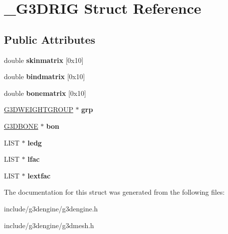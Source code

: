 \hypertarget{struct__G3DRIG}{}\section{\+\_\+\+G3\+D\+R\+IG Struct Reference}
\label{struct__G3DRIG}
\subsection*{Public Attributes}
\begin{DoxyCompactItemize}
\item 
\mbox{\label{struct__G3DRIG_a2da1891e087345819d0fb5ef3ef25485}} 
double {\bfseries skinmatrix} \mbox{[}0x10\mbox{]}
\item 
\mbox{\label{struct__G3DRIG_a0038f9bd45c5d69ae00a1072c7d61f43}} 
double {\bfseries bindmatrix} \mbox{[}0x10\mbox{]}
\item 
\mbox{\label{struct__G3DRIG_a91c0590b36dcd4bd41521f8566c2fc1a}} 
double {\bfseries bonematrix} \mbox{[}0x10\mbox{]}
\item 
\mbox{\label{struct__G3DRIG_a20ee58e1b3c805e140bbf6068bd1d272}} 
\hyperlink{struct__G3DWEIGHTGROUP}{G3\+D\+W\+E\+I\+G\+H\+T\+G\+R\+O\+UP} $\ast$ {\bfseries grp}
\item 
\mbox{\label{struct__G3DRIG_abd2564ea5d88320c5886b656dff5e0dd}} 
\hyperlink{struct__G3DBONE}{G3\+D\+B\+O\+NE} $\ast$ {\bfseries bon}
\item 
\mbox{\label{struct__G3DRIG_a4619dd0b9a617d35646569c938e92d24}} 
L\+I\+ST $\ast$ {\bfseries ledg}
\item 
\mbox{\label{struct__G3DRIG_aede97b36b38ef45927b6b6073804ac34}} 
L\+I\+ST $\ast$ {\bfseries lfac}
\item 
\mbox{\label{struct__G3DRIG_ae5b9f6497899e60c0f6dc51e6fafe20b}} 
L\+I\+ST $\ast$ {\bfseries lextfac}
\end{DoxyCompactItemize}


The documentation for this struct was generated from the following files\+:\begin{DoxyCompactItemize}
\item 
include/g3dengine/g3dengine.\+h\item 
include/g3dengine/g3dmesh.\+h\end{DoxyCompactItemize}

